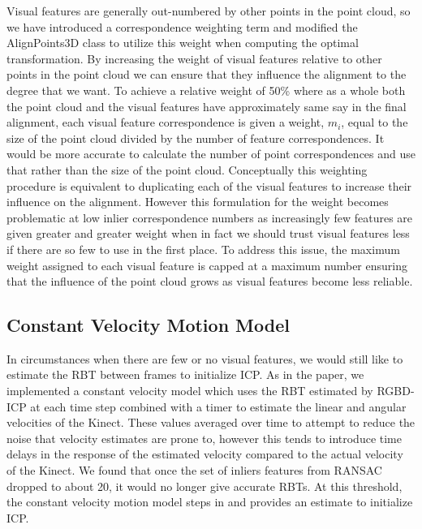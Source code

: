 \documentclass[letterpaper, 10pt, conference]{ieeeconf}
\begin{document}
	Visual features are generally out-numbered by other points in the point cloud, so we have introduced a correspondence weighting term and modified the AlignPoints3D class to utilize this weight when computing the optimal transformation.  By increasing the weight of visual features relative to other points in the point cloud we can ensure that they influence the alignment to the degree that we want.  To achieve a relative weight of 50\% where as a whole both the point cloud and the visual features have approximately same say in the final alignment, each visual feature correspondence is given a weight, $m_{i}$, equal to the size of the point cloud divided by the number of feature correspondences.  It would be more accurate to calculate the number of point correspondences and use that rather than the size of the point cloud.  Conceptually this weighting procedure is equivalent to duplicating each of the visual features to increase their influence on the alignment.  However this formulation for the weight becomes problematic at low inlier correspondence numbers as increasingly few features are given greater and greater weight when in fact we should trust visual features less if there are so few to use in the first place.  To address this issue, the maximum weight assigned to each visual feature is capped at a maximum number ensuring that the influence of the point cloud grows as visual features become less reliable. 

\subsection{Constant Velocity Motion Model}
In circumstances when there are few or no visual features, we would still like to estimate the RBT between frames to initialize ICP.  As in the paper, we implemented a constant velocity model which uses the RBT estimated by RGBD-ICP at each time step combined with a timer to estimate the linear and angular velocities of the Kinect.  These values averaged over time to attempt to reduce the noise that velocity estimates are prone to, however this tends to introduce time delays in the response of the estimated velocity compared to the actual velocity of the Kinect.  We found that once the set of inliers features from RANSAC dropped to about 20, it would no longer give accurate RBTs.  At this threshold, the constant velocity motion model steps in and provides an estimate to initialize ICP.
\end{document}
